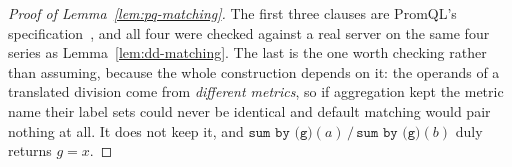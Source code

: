 \begin{proof}[Proof of Lemma~\ref{lem:pq-matching}]
The first three clauses are PromQL's specification~\citep{promql}, and all four were
checked against a real server on the same four series as Lemma~\ref{lem:dd-matching}. The last
is the one worth checking rather than assuming, because the whole construction depends on
it: the operands of a translated division come from \emph{different metrics}, so if
aggregation kept the metric name their label sets could never be identical and default
matching would pair nothing at all. It does not keep it, and
$\texttt{sum by (g)}(a)\,/\,\texttt{sum by (g)}(b)$ duly returns $g{=}x$.
\end{proof}
